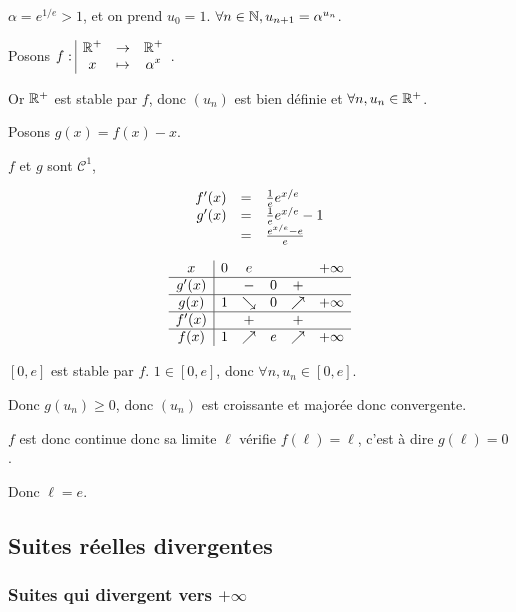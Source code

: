 \begin{exemple}
    \avspace $\alpha = e^{1/e} > 1$, et on prend $u_0 = 1$. $\forall n \in \mathbb{N}, u_{n + 1} = \alpha^{u_n}$.

    Posons $f: \space \begin{array}{|ccc} \displaystyle \mathbb{R}^+ & \to & \displaystyle \mathbb{R}^+ \\ \displaystyle x & \mapsto & \displaystyle \alpha^x \end{array}$.

    Or $\mathbb{R}^+$ est stable par $f$, donc $(u_n)$ est bien définie et $\forall n, u_n \in \mathbb{R}^+$.

    Posons $g(x) = f(x) - x$. 

    $f$ et $g$ sont $\mathscr C^1$, 

    $$\begin{array}{rcl}
        f'(x) & = & \frac 1 e e^{x/e} \\
        g'(x) & = & \frac 1 e e^{x/e} - 1 \\
        \space & = & \frac{e^{x / e} - e}{e} \\
    \end{array}
    $$

    $$
    \begin{array}{c|ccccc}
        x & 0 \space & e \space & & & + \infty \\
        \hline
        g'(x) & \space & - & 0 & + & \space \\
        \hline
        g(x) & 1 & \searrow & 0 & \nearrow & +\infty \\
        \hline
        f'(x) & \space & + & \space & + & \space \\
        \hline
        f(x) & 1 & \nearrow &  e & \nearrow & +\infty \\
    \end{array}
    $$

    $[0, e]$ est stable par $f$. $1 \in [0, e]$, donc $\forall n, u_n \in [0, e]$.

    Donc $g(u_n) \geqslant 0$, donc $(u_n)$ est croissante et majorée donc convergente. 

    $f$ est donc continue donc sa limite $\ell$ vérifie $f(\ell) = \ell$, c'est à dire 
    $g(\ell) = 0$.

    Donc $\ell = e$.
\end{exemple}

\subsection{Suites réelles divergentes}
\subsubsection{Suites qui divergent vers $+\infty$}

